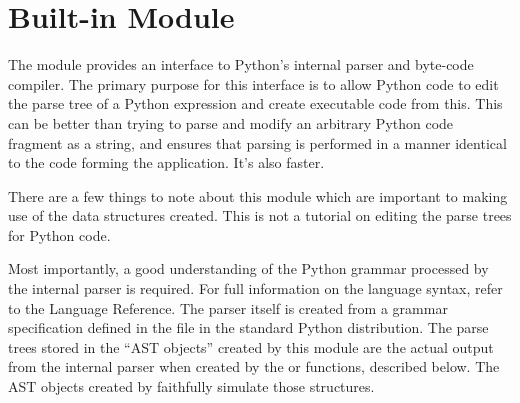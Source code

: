 %
%
%

\section{Built-in Module }



The  module provides an interface to Python's internal
parser and byte-code compiler.  The primary purpose for this interface
is to allow Python code to edit the parse tree of a Python expression
and create executable code from this.  This can be better than trying
to parse and modify an arbitrary Python code fragment as a string, and
ensures that parsing is performed in a manner identical to the code
forming the application.  It's also faster.

There are a few things to note about this module which are important
to making use of the data structures created.  This is not a tutorial
on editing the parse trees for Python code.

Most importantly, a good understanding of the Python grammar processed
by the internal parser is required.  For full information on the
language syntax, refer to the Language Reference.  The parser itself
is created from a grammar specification defined in the file
 in the standard Python distribution.  The parse
trees stored in the ``AST objects'' created by this module are the
actual output from the internal parser when created by the
 or  functions, described below.  The AST
objects created by  faithfully simulate those
structures.

